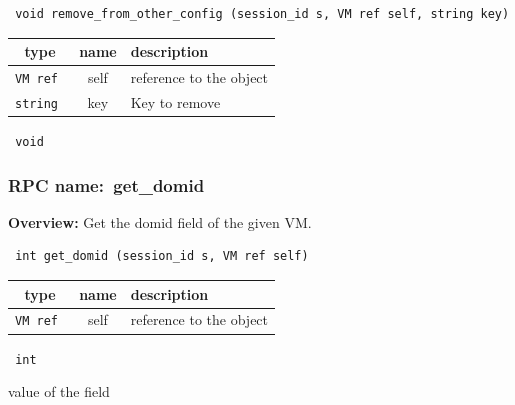 \begin{verbatim} void remove_from_other_config (session_id s, VM ref self, string key)\end{verbatim}



 
\vspace{0.3cm}
\begin{tabular}{|c|c|p{7cm}|}
 \hline
{\bf type} & {\bf name} & {\bf description} \\ \hline
{\tt VM ref } & self & reference to the object \\ \hline 

{\tt string } & key & Key to remove \\ \hline 

\end{tabular}

\vspace{0.3cm}

{\tt 
void
}



\vspace{0.3cm}
\vspace{0.3cm}
\vspace{0.3cm}
\subsubsection{RPC name:~get\_domid}

{\bf Overview:} 
Get the domid field of the given VM.

\begin{verbatim} int get_domid (session_id s, VM ref self)\end{verbatim}



 
\vspace{0.3cm}
\begin{tabular}{|c|c|p{7cm}|}
 \hline
{\bf type} & {\bf name} & {\bf description} \\ \hline
{\tt VM ref } & self & reference to the object \\ \hline 

\end{tabular}

\vspace{0.3cm}

{\tt 
int
}


value of the field
\vspace{0.3cm}
\vspace{0.3cm}
\vspace{0.3cm}
